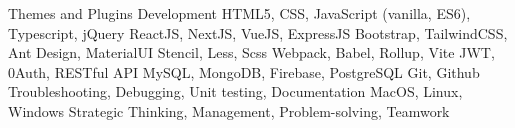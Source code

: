     \begin{cvskills}
         {Themes and Plugins Development}
         {HTML5, CSS, JavaScript (vanilla, ES6), Typescript, jQuery}
         {ReactJS, NextJS, VueJS, ExpressJS}
         {Bootstrap, TailwindCSS, Ant Design, MaterialUI}
         {Stencil, Less, Scss}
         {Webpack, Babel, Rollup, Vite}
         {JWT, 0Auth, RESTful API}
         {MySQL, MongoDB, Firebase, PostgreSQL}
         {Git, Github}
         {Troubleshooting, Debugging, Unit testing, Documentation}
         {MacOS, Linux, Windows}
         {Strategic Thinking, Management, Problem-solving, Teamwork}
\end{cvskills}
